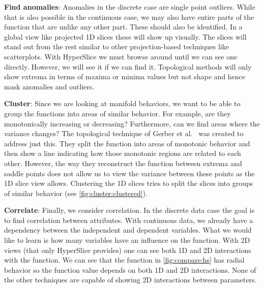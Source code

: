 \textbf{Find anomalies}:\label{find-anomalies}
Anomalies in the discrete case are single point outliers. While that is also
possible in the continuous case, we may also have entire parts of the function
that are unlike any other part. These should also be identified.
In a global view like projected 1D slices these will show up visually. The
slices will stand out from the rest similar to other projection-based
techniques like scatterplots. With HyperSlice we must browse around until we
can see one directly. However, we will see it if we can find it. Topological
methods will only show extrema in terms of maxima or minima values but not
shape and hence mask anomalies and outliers.

\textbf{Cluster}:\label{cluster}
Since we are looking at manifold behaviors, we want to be able to group the
functions into areas of similar behavior. For example, are they monotonically
increasing or decreasing? Furthermore, can we find areas where the variance
changes? The topological technique of Gerber et al.~\cite{Gerber:2010} was
created to address just this. They split the function
into areas of monotonic behavior and then show a line indicating how those
monotonic regions are related to each other. However, the way they
reconstruct the function between extrema and saddle points does not allow us to
view the variance between these points as the 1D slice view
allows. Clustering the 1D slices tries to split the slices into groups of
similar behavior (see \autoref{fig:cluster:clustered}).


\textbf{Correlate}:\label{correlate}
Finally, we consider correlation. In the discrete data case the goal is to find
correlation between attributes. With continuous data, we already have a
dependency between the independent and dependent variables. What we would like
to learn is how many variables have an influence on the function. With 2D views
(that only HyperSlice provides) one can see both 1D and 2D interactions with
the function. We can see that the function in \autoref{fig:compare:hs} has
radial behavior so the function value depends on both 1D and 2D interactions.
None of the other techniques are capable of showing 2D interactions between
parameters.

